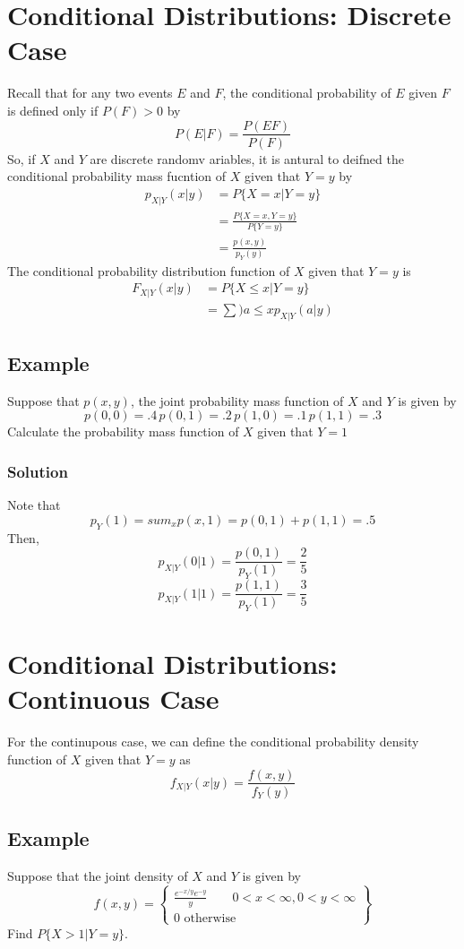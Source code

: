 \section{Conditional Distributions: Discrete Case}
Recall that for any two events $E$ and $F$, the conditional probability of $E$ given $F$ is defined only if $P(F) > 0$ by \[P(E|F) = \frac{P(EF)}{P(F)}\]
So, if $X$ and $Y$ are discrete randomv ariables, it is antural to deifned the conditional probability mass fucntion of $X$ given that $Y = y$ by 
\begin{equation*}
    \begin{split}
        p_{X | Y}(x\big | y) &= P\{X = x | Y = y\}\\
        &= \frac{P\{X = x, Y = y\}}{P\{Y = y\}}\\
        &= \frac{p(x,y)}{p_Y(y)}
    \end{split}
\end{equation*}
The conditional probability distribution function of $X$ given that $Y = y$ is \begin{equation*}
    \begin{split}
        F_{X|Y}(x\big | y) &= P\{X\leq x|Y = y\}\\
        &= \sum){a\leq x}p_{X|Y}(a\big | y)
    \end{split}
\end{equation*}
\subsection*{Example}
Suppose that $p(x,y)$, the joint probability mass function of $X$ and $Y$ is given by \[p(0,0) = .4\, p(0,1) = .2\, p(1,0) = .1\, p(1,1) = .3\] Calculate the probability mass function of $X$ given that $Y = 1$
\subsubsection*{Solution}
Note that \[p_Y(1) = sum_x p(x,1) = p(0,1) + p(1,1) = .5\]Then, \[p_{X|Y}(0|1) = \frac{p(0,1)}{p_Y(1)} = \frac{2}{5}\] \[p_{X|Y}(1|1) = \frac{p(1,1)}{p_Y(1)} = \frac{3}{5}\]
\section{Conditional Distributions: Continuous Case}
For the continupous case, we can define the conditional probability density function of $X$ given that $Y = y$ as \[f_{X|Y}(x|y) = \frac{f(x,y)}{f_Y(y)}\]
\subsection*{Example}
Suppose that the joint density of $X$ and $Y$ is given by 
\begin{equation*}
    f(x,y) =
    \left\{
        \begin{array}{lr}
            \frac{e^{-x/y}e^{-y}}{y} \qquad 0 < x < \infty, 0 < y < \infty\\
            0 \text{ otherwise}
        \end{array}
    \right\}
\end{equation*}
Find  $P\{X > 1|Y = y\}$.
